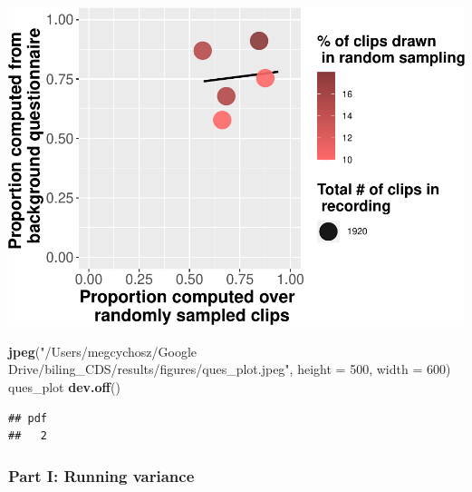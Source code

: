 \documentclass[
]{article}
\newenvironment{Shaded}{\begin{snugshade}}{\end{snugshade}}
\newcommand{\DataTypeTok}[1]{\textcolor[rgb]{0.13,0.29,0.53}{#1}}
\newcommand{\DecValTok}[1]{\textcolor[rgb]{0.00,0.00,0.81}{#1}}
\newcommand{\KeywordTok}[1]{\textcolor[rgb]{0.13,0.29,0.53}{\textbf{#1}}}
\newcommand{\NormalTok}[1]{#1}
\newcommand{\StringTok}[1]{\textcolor[rgb]{0.31,0.60,0.02}{#1}}
\begin{document}
\includegraphics{validation_results_files/figure-latex/questionnaire plot-1.pdf}

\begin{Shaded}
\begin{Highlighting}[]
\KeywordTok{jpeg}\NormalTok{(}\StringTok{"/Users/megcychosz/Google Drive/biling_CDS/results/figures/ques_plot.jpeg"}\NormalTok{, }\DataTypeTok{height =} \DecValTok{500}\NormalTok{, }\DataTypeTok{width =} \DecValTok{600}\NormalTok{)}
\NormalTok{ques_plot}
\KeywordTok{dev.off}\NormalTok{()}
\end{Highlighting}
\end{Shaded}

\begin{verbatim}
## pdf 
##   2
\end{verbatim}

\hypertarget{part-i-running-variance}{%
\subsubsection{Part I: Running variance}\label{part-i-running-variance}}
\end{document}
